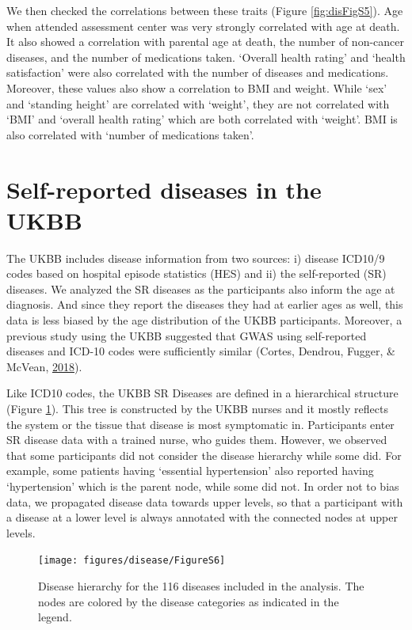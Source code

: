 \documentclass[12pt,twoside]{unicam}
\begin{document}
We then checked the correlations between these traits (Figure \ref{fig:disFigS5}). Age when attended assessment center was very strongly correlated with age at death. It also showed a correlation with parental age at death, the number of non-cancer diseases, and the number of medications taken. `Overall health rating' and `health satisfaction' were also correlated with the number of diseases and medications. Moreover, these values also show a correlation to BMI and weight. While `sex' and `standing height' are correlated with `weight', they are not correlated with `BMI' and `overall health rating' which are both correlated with `weight'. BMI is also correlated with `number of medications taken'.

\hypertarget{self-reported-diseases-in-the-ukbb}{%
\section{Self-reported diseases in the UKBB}\label{self-reported-diseases-in-the-ukbb}}

The UKBB includes disease information from two sources: i) disease ICD10/9 codes based on hospital episode statistics (HES) and ii) the self-reported (SR) diseases. We analyzed the SR diseases as the participants also inform the age at diagnosis. And since they report the diseases they had at earlier ages as well, this data is less biased by the age distribution of the UKBB participants. Moreover, a previous study using the UKBB suggested that GWAS using self-reported diseases and ICD-10 codes were sufficiently similar (Cortes, Dendrou, Fugger, \& McVean, \protect\hyperlink{ref-Cortes2018}{2018}).

Like ICD10 codes, the UKBB SR Diseases are defined in a hierarchical structure (Figure \ref{fig:disFigS6}). This tree is constructed by the UKBB nurses and it mostly reflects the system or the tissue that disease is most symptomatic in. Participants enter SR disease data with a trained nurse, who guides them. However, we observed that some participants did not consider the disease hierarchy while some did. For example, some patients having `essential hypertension' also reported having `hypertension' which is the parent node, while some did not. In order not to bias data, we propagated disease data towards upper levels, so that a participant with a disease at a lower level is always annotated with the connected nodes at upper levels.

\begin{figure}

{\centering \texttt{[image: figures/disease/FigureS6]} 

}

\caption[Disease hierarchy for the 116 diseases included in the analysis.]{Disease hierarchy for the 116 diseases included in the analysis. The nodes are colored by the disease categories as indicated in the legend.}\label{fig:disFigS6}
\end{figure}
\end{document}
